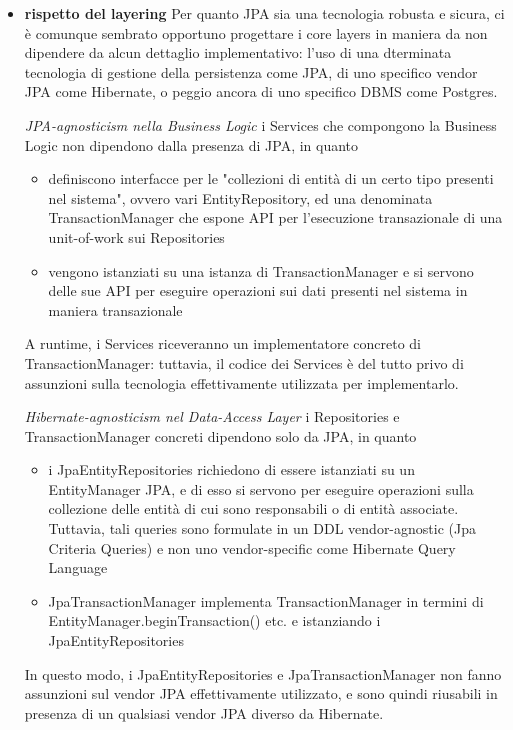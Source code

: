 \begin{itemize}
    \item \textbf{rispetto del layering} \newline
        Per quanto JPA sia una tecnologia robusta e sicura, ci è comunque sembrato opportuno
        progettare i core layers in maniera da non dipendere da alcun dettaglio implementativo: 
        l'uso di una dterminata tecnologia di gestione della persistenza come JPA, di uno specifico 
        vendor JPA come Hibernate, o peggio ancora di uno specifico DBMS come Postgres. 

        \textit{JPA-agnosticism nella Business Logic} \newline
        i Services che compongono la Business Logic non dipendono dalla presenza di JPA, in quanto
        \begin{itemize}
              \item definiscono interfacce per le "collezioni di entità di un certo tipo presenti
                    nel sistema", ovvero vari EntityRepository, ed una denominata TransactionManager
                    che espone API per l'esecuzione transazionale di una unit-of-work sui Repositories
              \item vengono istanziati su una istanza di TransactionManager e si servono delle sue API
                    per eseguire operazioni sui dati presenti nel sistema in maniera transazionale
        \end{itemize}
        A runtime, i Services riceveranno un implementatore concreto di TransactionManager: 
        tuttavia, il codice dei Services è del tutto privo di assunzioni sulla tecnologia 
        effettivamente utilizzata per implementarlo.

        \textit{Hibernate-agnosticism nel Data-Access Layer} \newline
        i Repositories e TransactionManager concreti dipendono solo da JPA, in quanto
        \begin{itemize}
              \item i JpaEntityRepositories richiedono di essere istanziati su un EntityManager JPA,
                    e di esso si servono per eseguire operazioni sulla collezione
                    delle entità di cui sono responsabili o di entità associate. Tuttavia, tali
                    queries sono formulate in un DDL vendor-agnostic (Jpa Criteria Queries) 
                    e non uno vendor-specific come Hibernate Query Language
              \item JpaTransactionManager implementa TransactionManager in termini di 
                    EntityManager.beginTransaction() etc. e istanziando i JpaEntityRepositories
        \end{itemize}
        In questo modo, i JpaEntityRepositories e JpaTransactionManager non fanno assunzioni 
        sul vendor JPA effettivamente utilizzato, e sono quindi riusabili in presenza di 
        un qualsiasi vendor JPA diverso da Hibernate.


\end{itemize}
